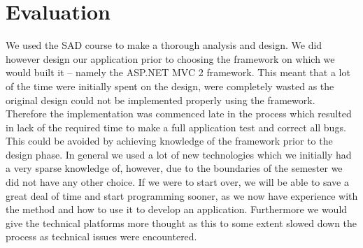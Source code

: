 \chapter{Evaluation}
\label{chap:discussion}
\emptyTop{}
We used the SAD course to make a thorough analysis and design.
We did however design our application prior to choosing the framework on which we would built it -- namely the ASP.NET MVC 2 framework.
This meant that a lot of the time were initially spent on the design, were completely wasted as the original design could not be implemented properly using the framework.
Therefore the implementation was commenced late in the process which resulted in lack of the required time to make a full application test and correct all bugs.
This could be avoided by achieving knowledge of the framework prior to the design phase. 
In general we used a lot of new technologies which we initially had a very sparse knowledge of, however, due to the boundaries of the semester we did not have any other choice.
If we were to start over, we will be able to save a great deal of time and start programming sooner, as we now have experience with the \ooad{} method and how to use it to develop an application. Furthermore we would give the technical platforms more thought as this to some extent slowed down the process as technical issues were encountered.

